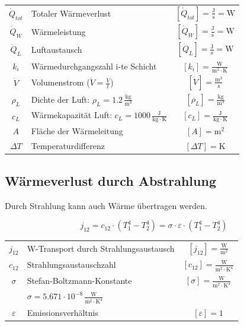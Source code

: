 \begin{tabular}{c l c}
	\rule{0pt}{10pt}$\dot{Q}_{tot}$ & Totaler Wärmeverlust & $[\dot{Q}_{tot}] = \mathrm{\frac{J}{s} = W}$ \\
	\rule{0pt}{10pt}$\dot{Q}_W$ & Wärmeleistung & $[\dot{Q}_W] = \mathrm{\frac{J}{s} = W}$ \\
	\rule{0pt}{10pt}$\dot{Q}_L$ & Luftaustausch & $[\dot{Q}_L] = \mathrm{\frac{J}{s} = W}$ \\
	\rule{0pt}{10pt}$k_i$ & Wärmedurchgangszahl i-te Schicht & $[k_i] = \mathrm{\frac{W}{m^2 \cdot K}}$ \\
	\rule{0pt}{10pt}$\dot{V}$ & Volumenstrom ($\dot{V} = \frac{V}{t}$) & $[\dot{V}] = \mathrm{\frac{m^3}{s}}$ \\
	\rule{0pt}{10pt}$\rho_L$ & Dichte der Luft: $\rho_L = 1.2 \, \mathrm{\frac{kg}{m^3}}$ & $[\rho_L] = \mathrm{\frac{kg}{m^3}}$ \\
	\rule{0pt}{10pt}$c_L$ & Wärmekapazität Luft: $c_L = 1000 \, \mathrm{\frac{J}{kg \cdot K}}$ & $[c_L] = \mathrm{\frac{J}{kg \cdot K}}$ \\
	$A$ & Fläche der Wärmeleitung & $[A] = \mathrm{m^2}$ \\
	$\Delta T$ & Temperaturdifferenz & $[\Delta T] = \mathrm{K}$ \\
\end{tabular}






\subsection{Wärmeverlust durch Abstrahlung}

Durch Strahlung kann auch Wärme übertragen werden.

$$ \boxed{ j_{12} = c_{12} \cdot (T_1^4 - T_2^4) = \sigma \cdot \varepsilon \cdot (T_1^4 - T_2^4) }   $$



\begin{tabular}{c l c}
	\rule{0pt}{10pt}$j_{12}$ & W-Transport durch Strahlungsaustausch & $[j_{12}] = \mathrm{\frac{W}{m^2}}$ \\
	\rule{0pt}{10pt}$c_{12}$ & Strahlungsaustauschzahl & $[c_{12}] = \mathrm{\frac{W}{m^2 \cdot K^4}}$ \\
	\rule{0pt}{10pt}$\sigma$ & Stefan-Boltzmann-Konstante  & $[\sigma] = \mathrm{\frac{W}{m^2 \cdot K^4}}$\\
	\rule{0pt}{10pt}&  $\sigma = 5.671 \cdot 10^{-8} \, \mathrm{\frac{W}{m^2 \cdot K^4}}$ &  \\
	\rule{0pt}{10pt}$\varepsilon$ & Emissionsverhältnis & $[\varepsilon] = 1$ \\
\end{tabular}









